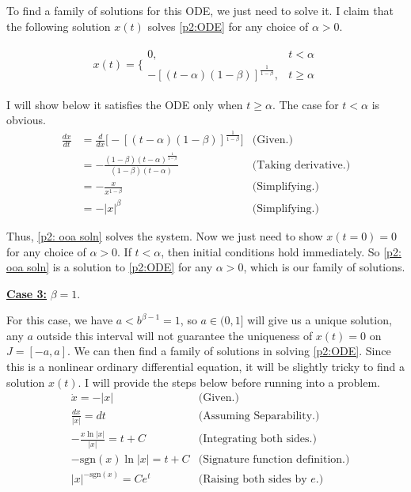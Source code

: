 \begin{solution}
    \jump
    To find a family of solutions for this ODE, we just need to solve it. I claim that the following solution $x(t)$ solves \ref{p2:ODE} for any choice of $\alpha > 0$.

    \begin{align}
        x(t) = 
        \Bigg\{\begin{array}{lr}
             0, &t < \alpha\\
             -[(t - \alpha)(1 - \beta)]^{\frac{1}{1 - \beta}}, &t \geq \alpha
        \end{array}
        \label{p2: ooa soln}
    \end{align}

    I will show below it satisfies the ODE only when $t \geq \alpha$. The case for $t < \alpha$ is obvious. 
    \alignbreak
    \begin{align}
        \frac{dx}{dt} &= \frac{d}{dx}\Bigg[ -[ (t - \alpha)(1 - \beta)] ^{\frac{1}{1-\beta}}\Bigg] &\text{(Given.)}\nonumber\\
        &= -\frac{(1 - \beta)(t - \alpha)^{\frac{1}{1 - \beta}}}{(1 - \beta)(t - \alpha)}   &\text{(Taking derivative.)}\nonumber\\
        &= -\frac{x}{x^{1 - \beta}} &\text{(Simplifying.)}\nonumber\\
        &= -|x|^\beta &\text{(Simplifying.)}\nonumber
    \end{align}
    \alignbreak
    
    Thus, \ref{p2: ooa soln} solves the system. Now we just need to show $x(t = 0) = 0$ for any choice of $\alpha > 0$. If $t < \alpha$, then initial conditions hold immediately. So \ref{p2: ooa soln} is a solution to \ref{p2:ODE} for any $\alpha > 0$, which is our family of solutions.  

    \jump
    \underline{\textbf{Case 3:}} $\beta = 1$.
    \jump

    For this case, we have $a < b^{\beta - 1} = 1$, so $a \in (0, 1]$ will give us a unique solution, any $a$ outside this interval will not guarantee the uniqueness of $x(t) = 0$ on $J = [-a, a]$. We can then find a family of solutions in solving \ref{p2:ODE}. Since this is a nonlinear ordinary differential equation, it will be slightly tricky to find a solution $x(t)$. I will provide the steps below before running into a problem.
    \alignbreak
    \begin{align}
        &\dot{x} = - |x| &\text{(Given.)}\nonumber\\
        &\frac{dx}{|x|} = dt    &\text{(Assuming Separability.)}\nonumber\\
        &-\frac{x\ln |x|}{|x|} = t + C  &\text{(Integrating both sides.)}\nonumber\\
        &-\text{sgn}(x)\ln |x| = t + C   &\text{(Signature function definition.)}\nonumber\\
        &|x|^{-\text{sgn}(x)} = Ce^t &\text{(Raising both sides by $e$.)}\nonumber
    \end{align}
    \alignbreak


\end{solution}
